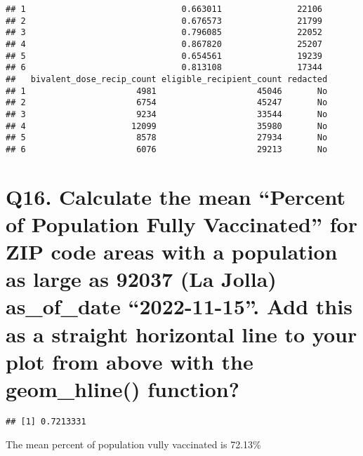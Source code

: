 \documentclass[
]{article}
\newenvironment{Shaded}{\begin{snugshade}}{\end{snugshade}}
\newcommand{\FloatTok}[1]{\textcolor[rgb]{0.00,0.00,0.81}{#1}}
\newcommand{\FunctionTok}[1]{\textcolor[rgb]{0.00,0.00,0.00}{#1}}
\newcommand{\NormalTok}[1]{#1}
\newcommand{\SpecialCharTok}[1]{\textcolor[rgb]{0.00,0.00,0.00}{#1}}
\begin{document}
\begin{verbatim}
## 1                               0.663011               22106
## 2                               0.676573               21799
## 3                               0.796085               22052
## 4                               0.867820               25207
## 5                               0.654561               19239
## 6                               0.813108               17344
##   bivalent_dose_recip_count eligible_recipient_count redacted
## 1                      4981                    45046       No
## 2                      6754                    45247       No
## 3                      9234                    33544       No
## 4                     12099                    35980       No
## 5                      8578                    27934       No
## 6                      6076                    29213       No
\end{verbatim}

\hypertarget{q16.-calculate-the-mean-percent-of-population-fully-vaccinated-for-zip-code-areas-with-a-population-as-large-as-92037-la-jolla-as_of_date-2022-11-15.-add-this-as-a-straight-horizontal-line-to-your-plot-from-above-with-the-geom_hline-function}{%
\section{Q16. Calculate the mean ``Percent of Population Fully
Vaccinated'' for ZIP code areas with a population as large as 92037 (La
Jolla) as\_of\_date ``2022-11-15''. Add this as a straight horizontal
line to your plot from above with the geom\_hline()
function?}\label{q16.-calculate-the-mean-percent-of-population-fully-vaccinated-for-zip-code-areas-with-a-population-as-large-as-92037-la-jolla-as_of_date-2022-11-15.-add-this-as-a-straight-horizontal-line-to-your-plot-from-above-with-the-geom_hline-function}}

\begin{Shaded}
\end{Shaded}

\begin{verbatim}
## [1] 0.7213331
\end{verbatim}

The mean percent of population vully vaccinated is 72.13\%
\end{document}
